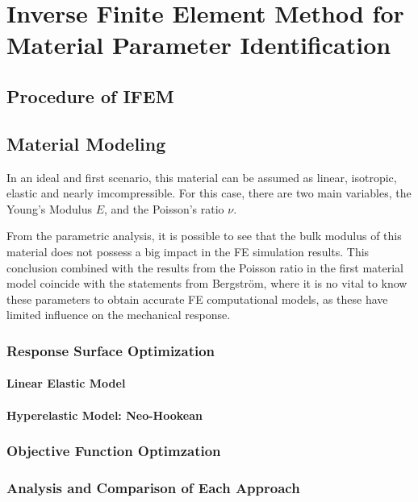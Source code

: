 
\chapter{Inverse Finite Element Method for Material Parameter Identification} %

\label{Chapter5} %

\section{Procedure of IFEM}
\section{Material Modeling}

In an ideal and first scenario, this material can be assumed as linear, isotropic, 
elastic and nearly imcompressible. For this case, there are two main variables, the Young's
Modulus \(E\), and the Poisson's ratio $\nu$.

From the parametric analysis, it is possible to see that the bulk 
modulus of this material does not possess a big impact in the FE 
simulation results. This conclusion combined with the results 
from the Poisson ratio in the first material model coincide with the 
statements from Bergström, where it is no vital to know these parameters 
to obtain accurate FE computational models, as these have limited
influence on the mechanical response. \cite{Bergström2015} %

\subsection{Response Surface Optimization}

\subsubsection*{Linear Elastic Model}

\subsubsection*{Hyperelastic Model: Neo-Hookean}


\subsection{Objective Function Optimzation}

\subsection{Analysis and Comparison of Each Approach}

